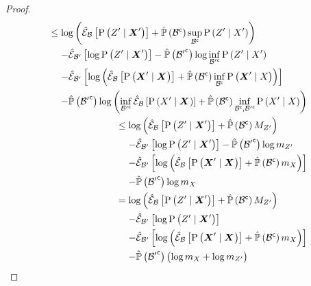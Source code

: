 \begin{proof}
	\begin{align}
		\begin{split}
			&\leq\log\left(\partialestimator{\probcond{\observations{}^\prime}{\statesRV{}^\prime}}{\subSpace}+\estimatedmeasure{\stcomp{\subSpace}}\sup_{\stcomp{\subSpace}}\probcond{\observations{}^\prime}{\states{}^\prime}\right)\\
			&\phantomeq-\partialestimator{\log\probcond{\observations{}^\prime}{\statesRV{}^\prime}}{\subSpace^\prime}-\estimatedmeasure{\stcomp{\subSpace^\prime}}\log\inf_{\stcomp{\subSpace^\prime}}\probcond{\observations{}^\prime}{\states{}^\prime}\\
			&\phantomeq-\partialestimator{\log\left(\partialestimator{\probcond{\statesRV{}^\prime}{\statesRV{}}}{\subSpace}+\estimatedmeasure{\stcomp{\subSpace}}\inf_{\stcomp{\subSpace}}\probcond{\statesRV{}^\prime}{\states{}}\right)}{\subSpace^\prime}\\
			&\phantomeq-\estimatedmeasure{\stcomp{\subSpace^\prime}}\log\left(\inf_{\stcomp{\subSpace^\prime}}\partialestimator{\probcond{\states{}^\prime}{\statesRV{}}}{\subSpace}+\estimatedmeasure{\stcomp{\subSpace}}\inf_{\stcomp{\subSpace},\stcomp{\subSpace^\prime}}\probcond{\states{}^\prime}{\states{}}\right)
		\end{split}\\
		\begin{split}
			&\leq\log\left(\partialestimator{\probcond{\observations{}^\prime}{\statesRV{}^\prime}}{\subSpace}+\estimatedmeasure{\stcomp{\subSpace}}M_{\observations{}^\prime}\right)\\
			&\phantomeq-\partialestimator{\log\probcond{\observations{}^\prime}{\statesRV{}^\prime}}{\subSpace^\prime}-\estimatedmeasure{\stcomp{\subSpace^\prime}}\log m_{\observations{}^\prime}\\
			&\phantomeq-\partialestimator{\log\left(\partialestimator{\probcond{\statesRV{}^\prime}{\statesRV{}}}{\subSpace}+\estimatedmeasure{\stcomp{\subSpace}}m_{\states{}}\right)}{\subSpace^\prime}\\
			&\phantomeq-\estimatedmeasure{\stcomp{\subSpace^\prime}}\log m_{\states{}}
		\end{split}\\
		\begin{split}
			&=\log\left(\partialestimator{\probcond{\observations{}^\prime}{\statesRV{}^\prime}}{\subSpace}+\estimatedmeasure{\stcomp{\subSpace}}M_{\observations{}^\prime}\right)\\
			&\phantomeq-\partialestimator{\log\probcond{\observations{}^\prime}{\statesRV{}^\prime}}{\subSpace^\prime}\\
			&\phantomeq-\partialestimator{\log\left(\partialestimator{\probcond{\statesRV{}^\prime}{\statesRV{}}}{\subSpace}+\estimatedmeasure{\stcomp{\subSpace}}m_{\states{}}\right)}{\subSpace^\prime}\\
			&\phantomeq-\estimatedmeasure{\stcomp{\subSpace^\prime}}\left(\log m_{\states{}}+\log m_{\observations{}^\prime}\right)
		\end{split}
	\end{align}
\end{proof}

